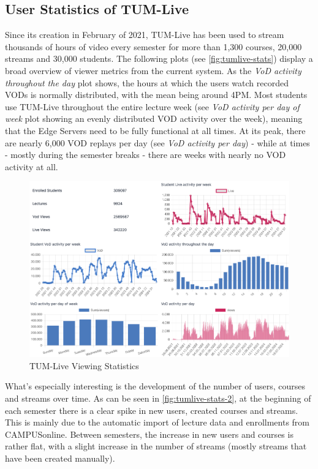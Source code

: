 \subsection{User Statistics of TUM-Live}\label{subsection:user-stats-tumlive}

Since its creation in February of 2021, TUM-Live has been used to stream thousands of hours of video every semester for more than 1,300 courses, 20,000 streams and 30,000 students. The following plots (see \autoref{fig:tumlive-stats}) display a broad overview of viewer metrics from the current system. As the \textit{VoD activity throughout the day} plot shows, the hours at which the users watch recorded \ac{VOD}s is normally distributed, with the mean being around 4PM. Most students use TUM-Live throughout the entire lecture week (see \textit{VoD activity per day of week} plot showing an evenly distributed \ac{VOD} activity over the week), meaning that the Edge Servers need to be fully functional at all times. At its peak, there are nearly 6,000 \ac{VOD} replays per day (see \textit{VoD activity per day}) - while at times - mostly during the semester breaks - there are weeks with nearly no \ac{VOD} activity at all.

\begin{figure}[htpb]
    \centering
    \includegraphics[width=\linewidth]{images/TUMLiveStats.png}
    \caption[TUM-Live Statistics]{TUM-Live Viewing Statistics}\label{fig:tumlive-stats}
\end{figure}

What's especially interesting is the development of the number of users, courses and streams over time. As can be seen in \autoref{fig:tumlive-stats-2}, at the beginning of each semester there is a clear spike in new users, created courses and streams. This is mainly due to the automatic import of lecture data and enrollments from CAMPUSonline. Between semesters, the increase in new users and courses is rather flat, with a slight increase in the number of streams (mostly streams that have been created manually).  

